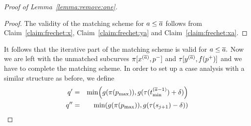 \documentclass[11pt, letter]{article}
\newcommand{\lemref}[1]{Lemma~\ref{lemma:#1}}
\newcommand{\claimref}[1]{Claim~\ref{claim:#1}}
\providecommand{\pth}[2][\!]{#1\left({#2}\right)}
\begin{document}
\begin{proof}[Proof of \lemref{remove:one}]
\begin{proof}
The validity of the matching scheme  for $a\leq \overline{a}$ follows from \claimref{frechet:x}, \claimref{frechet:ya} and \claimref{frechet:xa}.
\end{proof}

It follows that the iterative part of the matching scheme is valid for $a\leq
\overline{a}.$ 
Now we are left with the unmatched subcurves $\pi[x^{(\overline{a})}, p^{-}]$ and
$\tau[y^{(\overline{a})}, f(p^{+})]$ and we have to complete the matching scheme.
In order to set up a case analysis with a similar structure as before, we define 
\begin{eqnarray*}
q'&=& \min\pth{g(\pi(p_{\max})), g(\tau(t_{\min}^{(\Astop-1)})+\delta)}\\
q''&=& \min\pth{g(\pi(p_{\max})), g(\tau(s_{j+1})-\delta)}
\end{eqnarray*}


\end{proof}
\end{document}
